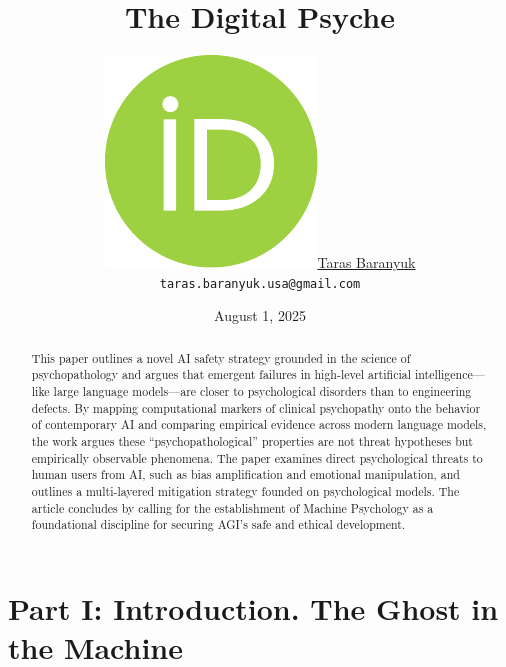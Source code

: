 \documentclass{article}
\title{The Digital Psyche}
\date{August 1, 2025}
\author{\href{https://orcid.org/0009-0004-4127-0477}{\includegraphics[scale=0.06]{orcid.pdf}\hspace{1mm}Taras Baranyuk} \\
	\texttt{taras.baranyuk.usa@gmail.com} \\
}
\begin{document}
\maketitle

\begin{abstract}
This paper outlines a novel AI safety strategy grounded in the science of psychopathology and argues that emergent failures in high-level artificial intelligence—like large language models—are closer to psychological disorders than to engineering defects. By mapping computational markers of clinical psychopathy onto the behavior of contemporary AI and comparing empirical evidence across modern language models, the work argues these “psychopathological” properties are not threat hypotheses but empirically observable phenomena. The paper examines direct psychological threats to human users from AI, such as bias amplification and emotional manipulation, and outlines a multi-layered mitigation strategy founded on psychological models. The article concludes by calling for the establishment of Machine Psychology as a foundational discipline for securing AGI's safe and ethical development.
\end{abstract}




\section{Part I: Introduction. The Ghost in the Machine}
\end{document}
